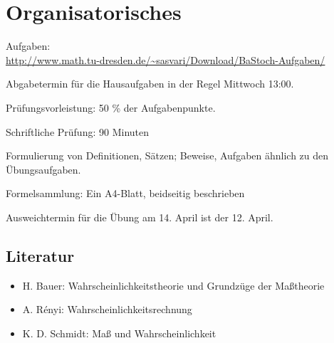 \section*{Organisatorisches}
Aufgaben:\\
\url{http://www.math.tu-dresden.de/~sasvari/Download/BaStoch-Aufgaben/}

Abgabetermin für die Hausaufgaben in der Regel Mittwoch 13:00.

Prüfungsvorleistung: 50 \% der Aufgabenpunkte.

Schriftliche Prüfung: 90 Minuten

Formulierung von Definitionen, Sätzen; Beweise, Aufgaben ähnlich zu den
Übungsaufgaben.

Formelsammlung: Ein A4-Blatt, beidseitig beschrieben

Ausweichtermin für die Übung am 14. April ist der 12. April.

\subsection*{Literatur}
\begin{itemize}
\item H. Bauer: Wahrscheinlichkeitstheorie und Grundzüge der Maßtheorie
\item A. Rényi: Wahrscheinlichkeitsrechnung
\item K. D. Schmidt: Maß und Wahrscheinlichkeit
\end{itemize}